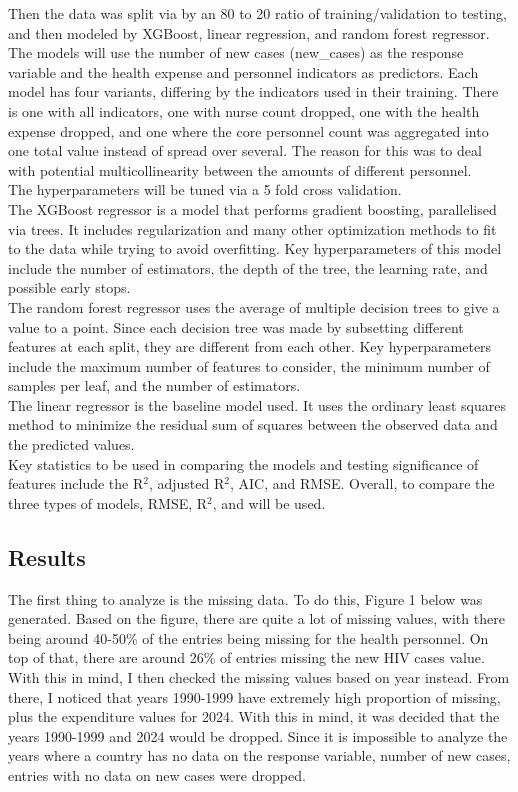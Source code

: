 \documentclass[
  letterpaper,
  DIV=11,
  numbers=noendperiod]{scrartcl}
\begin{document}
Then the data was split via by an 80 to 20 ratio of training/validation
to testing, and then modeled by XGBoost, linear regression, and random
forest regressor. The models will use the number of new cases
(new\_cases) as the response variable and the health expense and
personnel indicators as predictors. Each model has four variants,
differing by the indicators used in their training. There is one with
all indicators, one with nurse count dropped, one with the health
expense dropped, and one where the core personnel count was aggregated
into one total value instead of spread over several. The reason for this
was to deal with potential multicollinearity between the amounts of
different personnel. \\
The hyperparameters will be tuned via a 5 fold
cross validation. \\
The XGBoost regressor is a model that performs
gradient boosting, parallelised via trees. It includes regularization
and many other optimization methods to fit to the data while trying to
avoid overfitting. Key hyperparameters of this model include the number
of estimators, the depth of the tree, the learning rate, and possible
early stops. \\
The random forest regressor uses the average of multiple
decision trees to give a value to a point. Since each decision tree was
made by subsetting different features at each split, they are different
from each other. Key hyperparameters include the maximum number of
features to consider, the minimum number of samples per leaf, and the
number of estimators. \\
The linear regressor is the baseline model used.
It uses the ordinary least squares method to minimize the residual sum
of squares between the observed data and the predicted values. \\
Key statistics to be used in comparing the models and testing significance
of features include the R\(^2\), adjusted R\(^2\), AIC, and RMSE.
Overall, to compare the three types of models, RMSE, R\(^2\), and
will be used.

\subsection{Results}\label{results}

The first thing to analyze is the missing data. To do this, Figure 1 below was
generated. Based on the figure, there are quite a lot of missing values,
with there being around 40-50\% of the entries being missing for the
health personnel. On top of that, there are around 26\% of entries
missing the new HIV cases value. With this in mind, I then checked the
missing values based on year instead. From there, I noticed that years
1990-1999 have extremely high proportion of missing, plus the
expenditure values for 2024. With this in mind, it was decided that the
years 1990-1999 and 2024 would be dropped. Since it is impossible to
analyze the years where a country has no data on the response variable,
number of new cases, entries with no data on new cases were dropped.
\end{document}
